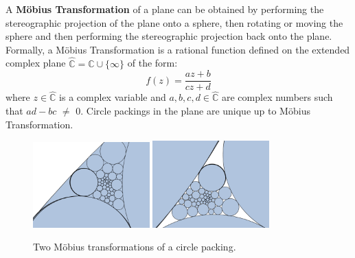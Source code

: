 \documentclass[a4paper,UKenglish]{lipics}
\newcommand{\C}{\mathbb{C}}
\newcommand{\CP}{\hat{\mathbb{C}}}
\begin{document}
  A \textbf{M\"{o}bius Transformation} of a plane can be obtained by performing the stereographic projection of the plane onto a sphere, then rotating or moving the sphere and then performing the stereographic projection back onto the plane. 
  Formally, a M\"{o}bius Transformation is a rational function defined on the extended complex plane $\CP = \C\cup\{\infty\}$ of the form:
  \begin{equation} 
  	f(z) = \frac{az+b}{cz+d}
  \end{equation}
  where $z\in\CP$ is a complex variable and $a,b,c,d\in\CP$ are complex numbers such that $ad - bc$ $\neq$ $0$.
  Circle packings in the plane are unique up to M\"{o}bius Transformation.
    \begin{figure}[ht]
      \centering
        \includegraphics[width = 0.40\textwidth]{figures/mobius3.png}
        \includegraphics[width = 0.40\textwidth]{figures/mobius4.png}
      \caption{Two M\"{o}bius transformations of a circle packing.}
      \label{fig:mobius}
    \end{figure}
\end{document}
